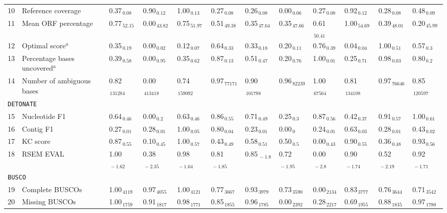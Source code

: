 \documentclass{scrartcl}
\begin{document}
\begin{landscape}
\begin{table}
\begin{scriptsize}
\begin{tabular}{llllllllllll}
10 & Reference coverage  & 0.37$_{\,0.08}$ & 0.90$_{\,0.12}$ & 1.00$_{\,0.13}$ & 0.27$_{\,0.08}$ & 0.26$_{\,0.08}$ & 0.00$_{\,0.06}$ & 0.27$_{\,0.08}$ & 0.92$_{\,0.12}$ & 0.28$_{\,0.08}$ & 0.48$_{\,0.09}$ \\11 & Mean ORF percentage  & 0.77$_{\,52.15}$ & 0.00$_{\,43.82}$ & 0.75$_{\,51.97}$ & 0.51$_{\,49.38}$ & 0.35$_{\,47.64}$ & 0.35$_{\,47.66}$ & 0.61$_{\,50.41}$ & 1.00$_{\,54.69}$ & 0.39$_{\,48.01}$ & 0.20$_{\,45.99}$ \\12 & Optimal score$^{a}$  & 0.35$_{\,0.19}$ & 0.00$_{\,0.02}$ & 0.12$_{\,0.07}$ & 0.64$_{\,0.33}$ & 0.33$_{\,0.18}$ & 0.20$_{\,0.11}$ & 0.76$_{\,0.39}$ & 0.04$_{\,0.04}$ & 1.00$_{\,0.51}$ & 0.57$_{\,0.3}$ \\13 & Percentage bases uncovered$^{a}$  & 0.39$_{\,0.58}$ & 0.00$_{\,0.95}$ & 0.35$_{\,0.62}$ & 0.87$_{\,0.13}$ & 0.51$_{\,0.47}$ & 0.20$_{\,0.76}$ & 1.00$_{\,0.01}$ & 0.25$_{\,0.71}$ & 0.98$_{\,0.03}$ & 0.80$_{\,0.2}$ \\14 & Number of ambiguous bases  & 0.82$_{\,131284}$ & 0.00$_{\,413418}$ & 0.74$_{\,159092}$ & 0.97$_{\,77171}$ & 0.90$_{\,101788}$ & 0.96$_{\,82239}$ & 1.00$_{\,67564}$ & 0.81$_{\,134108}$ & 0.97$_{\,76646}$ & 0.85$_{\,120597}$ \\\midrule
\multicolumn{11}{l}{\texttt{DETONATE}}\\ 
\midrule
15 & Nucleotide F1  & 0.64$_{\,0.46}$ & 0.00$_{\,0.2}$ & 0.63$_{\,0.46}$ & 0.86$_{\,0.55}$ & 0.71$_{\,0.49}$ & 0.25$_{\,0.3}$ & 0.87$_{\,0.56}$ & 0.42$_{\,0.37}$ & 0.91$_{\,0.57}$ & 1.00$_{\,0.61}$ \\16 & Contig F1  & 0.27$_{\,0.01}$ & 0.28$_{\,0.01}$ & 1.00$_{\,0.05}$ & 0.80$_{\,0.04}$ & 0.23$_{\,0.01}$ & 0.00$_{\,0}$ & 0.24$_{\,0.01}$ & 0.63$_{\,0.03}$ & 0.28$_{\,0.01}$ & 0.43$_{\,0.02}$ \\17 & KC score  & 0.87$_{\,0.55}$ & 0.10$_{\,0.45}$ & 1.00$_{\,0.57}$ & 0.43$_{\,0.49}$ & 0.58$_{\,0.51}$ & 0.50$_{\,0.5}$ & 0.00$_{\,0.43}$ & 0.90$_{\,0.55}$ & 0.36$_{\,0.48}$ & 0.93$_{\,0.56}$ \\18 & RSEM EVAL  & 1.00$_{\,-1.62}$ & 0.38$_{\,-2.35}$ & 0.98$_{\,-1.64}$ & 0.81$_{\,-1.85}$ & 0.85$_{\,-1.8}$ & 0.72$_{\,-1.95}$ & 0.00$_{\,-2.8}$ & 0.90$_{\,-1.74}$ & 0.52$_{\,-2.19}$ & 0.92$_{\,-1.71}$ \\\midrule
\multicolumn{11}{l}{\texttt{BUSCO}}\\ 
\midrule
19 & Complete BUSCOs  & 1.00$_{\,4119}$ & 0.97$_{\,4055}$ & 1.00$_{\,4121}$ & 0.77$_{\,3667}$ & 0.93$_{\,3979}$ & 0.73$_{\,3590}$ & 0.00$_{\,2134}$ & 0.83$_{\,3777}$ & 0.76$_{\,3644}$ & 0.71$_{\,3542}$ \\20 & Missing BUSCOs  & 1.00$_{\,1759}$ & 0.91$_{\,1817}$ & 0.98$_{\,1771}$ & 0.85$_{\,1855}$ & 0.96$_{\,1785}$ & 0.00$_{\,2392}$ & 0.28$_{\,2217}$ & 0.69$_{\,1955}$ & 0.88$_{\,1835}$ & 0.97$_{\,1780}$ \\\midrule

\end{tabular}
\end{scriptsize}
\end{table}
\end{landscape}
\end{document}
